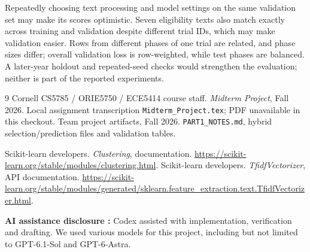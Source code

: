 \documentclass[10pt,twocolumn,letterpaper]{article}
\begin{document}
Repeatedly choosing text processing and model settings on the same validation
set may make its scores optimistic. Seven eligibility texts also match exactly across
training and validation despite different trial IDs, which may make validation
easier. Rows from different phases of one trial are related, and phase sizes
differ; overall validation loss is row-weighted, while test phases are balanced.
A later-year holdout and repeated-seed checks would strengthen the evaluation;
neither is part of the reported experiments.

\begin{thebibliography}{9}
 Cornell CS5785 / ORIE5750 / ECE5414 course staff.
\emph{Midterm Project}, Fall 2026. Local assignment transcription
\texttt{Midterm\_Project.tex}; PDF unavailable in this checkout.
 Team project artifacts, Fall 2026.
\texttt{PART1\_NOTES.md}, hybrid selection/prediction files and validation tables.

 Scikit-learn developers. \emph{Clustering}, documentation.
\url{https://scikit-learn.org/stable/modules/clustering.html}.
 Scikit-learn developers. \emph{TfidfVectorizer}, API documentation.
\url{https://scikit-learn.org/stable/modules/generated/sklearn.feature_extraction.text.TfidfVectorizer.html}.
\end{thebibliography}
\noindent\textbf{AI assistance disclosure : }
Codex assisted with implementation, verification and drafting. We used various models for this project, including but not limited to GPT-6.1-Sol and GPT-6-Astra.
\end{document}
